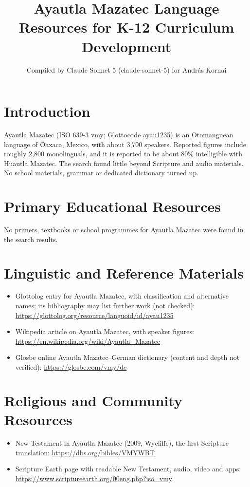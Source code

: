 \documentclass[12pt]{article}
\title{Ayautla Mazatec Language Resources for K-12 Curriculum Development}
\author{Compiled by Claude Sonnet 5 (claude-sonnet-5) for Andr\'as Kornai}
\date{}
\begin{document}
\maketitle

\section{Introduction}
Ayautla Mazatec (ISO 639-3 vmy; Glottocode ayau1235) is an Otomanguean language of Oaxaca, Mexico, with about 3,700 speakers. Reported figures include roughly 2,800 monolinguals, and it is reported to be about 80\% intelligible with Huautla Mazatec. The search found little beyond Scripture and audio materials. No school materials, grammar or dedicated dictionary turned up.

\section{Primary Educational Resources}
No primers, textbooks or school programmes for Ayautla Mazatec were found in the search results.

\section{Linguistic and Reference Materials}
\begin{itemize}
\item Glottolog entry for Ayautla Mazatec, with classification and alternative names; its bibliography may list further work (not checked): \url{https://glottolog.org/resource/languoid/id/ayau1235}
\item Wikipedia article on Ayautla Mazatec, with speaker figures: \url{https://en.wikipedia.org/wiki/Ayautla_Mazatec}
\item Glosbe online Ayautla Mazatec--German dictionary (content and depth not verified): \url{https://glosbe.com/vmy/de}
\end{itemize}

\section{Religious and Community Resources}
\begin{itemize}
\item New Testament in Ayautla Mazatec (2009, Wycliffe), the first Scripture translation: \url{https://dbs.org/bibles/VMYWBT}
\item Scripture Earth page with readable New Testament, audio, video and apps: \url{https://www.scriptureearth.org/00eng.php?iso=vmy}
\end{itemize}
\end{document}
